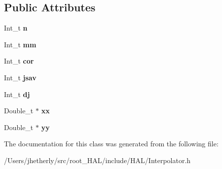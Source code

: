 \subsection*{Public Attributes}
\begin{DoxyCompactItemize}
\item 
\hypertarget{class_h_a_l_1_1_interp_base_a70c78b7c0ba2fe8a5ac3091ebb70f1ae}{Int\+\_\+t {\bfseries n}}\label{class_h_a_l_1_1_interp_base_a70c78b7c0ba2fe8a5ac3091ebb70f1ae}

\item 
\hypertarget{class_h_a_l_1_1_interp_base_a8691b520d0856373d8763be3cf0a9082}{Int\+\_\+t {\bfseries mm}}\label{class_h_a_l_1_1_interp_base_a8691b520d0856373d8763be3cf0a9082}

\item 
\hypertarget{class_h_a_l_1_1_interp_base_acfe70f15b2295e6b2399c02802072c9c}{Int\+\_\+t {\bfseries cor}}\label{class_h_a_l_1_1_interp_base_acfe70f15b2295e6b2399c02802072c9c}

\item 
\hypertarget{class_h_a_l_1_1_interp_base_a76921f15cd1908cdbe5bcc6afeb1ecc4}{Int\+\_\+t {\bfseries jsav}}\label{class_h_a_l_1_1_interp_base_a76921f15cd1908cdbe5bcc6afeb1ecc4}

\item 
\hypertarget{class_h_a_l_1_1_interp_base_af433768e4c59a1209919246ecb991c86}{Int\+\_\+t {\bfseries dj}}\label{class_h_a_l_1_1_interp_base_af433768e4c59a1209919246ecb991c86}

\item 
\hypertarget{class_h_a_l_1_1_interp_base_acdfb5ae98e96886c9055f36d29ebd25e}{Double\+\_\+t $\ast$ {\bfseries xx}}\label{class_h_a_l_1_1_interp_base_acdfb5ae98e96886c9055f36d29ebd25e}

\item 
\hypertarget{class_h_a_l_1_1_interp_base_a49d9cd794e1c97a0ed3f3bab3a999b8b}{Double\+\_\+t $\ast$ {\bfseries yy}}\label{class_h_a_l_1_1_interp_base_a49d9cd794e1c97a0ed3f3bab3a999b8b}

\end{DoxyCompactItemize}


The documentation for this class was generated from the following file\+:\begin{DoxyCompactItemize}
\item 
/\+Users/jhetherly/src/root\+\_\+\+H\+A\+L/include/\+H\+A\+L/Interpolator.\+h\end{DoxyCompactItemize}
